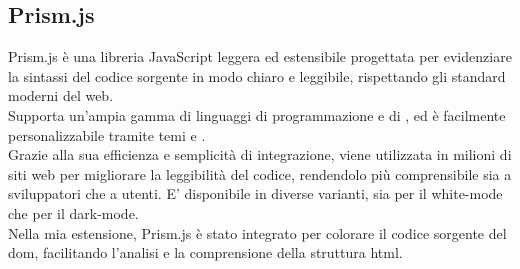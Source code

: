 \subsection{Prism.js}
\label{subsec:prism}
\noindent Prism.js è una libreria JavaScript leggera ed estensibile progettata per evidenziare la sintassi del codice sorgente in modo chiaro e leggibile, rispettando gli standard moderni del web. \\
Supporta un’ampia gamma di linguaggi di programmazione e di , ed è facilmente personalizzabile tramite temi e . \\
Grazie alla sua efficienza e semplicità di integrazione, viene utilizzata in milioni di siti web per migliorare la leggibilità del codice, rendendolo più comprensibile sia a sviluppatori che a utenti. E’ disponibile in diverse varianti, sia per il white-mode che per il dark-mode.\\
Nella mia estensione, Prism.js è stato integrato per colorare il codice sorgente del \acrshort{dom}, facilitando l’analisi e la comprensione della struttura \acrshort{html}.

